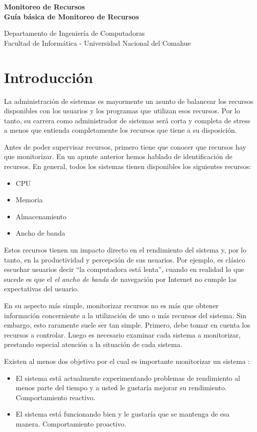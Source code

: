 \documentclass[12pt]{article}
\def\maketitle{

 \makeatletter
 {\color{bl} \centering \huge \sc \textbf{
 Monitoreo de Recursos \\ 
\large \vspace*{-8pt} \color{black} Guía básica de Monitoreo de Recursos 
 \vspace*{8pt} }\par}
 \makeatother


 \makeatletter
 {\centering \small 
 	Departamento de Ingeniería de Computadoras \\
 	Facultad de Informática - Universidad Nacional del Comahue \\
 	\vspace{20pt} }
 \makeatother

}
\begin{document}
\thispagestyle{empty}
\maketitle
\setlength{\parindent}{0pt}

\section*{Introducción}

La administración de sistemas es mayormente un asunto de balancear los 
recursos disponibles con los usuarios y los programas que utilizan esos 
recursos. Por lo tanto, su carrera como administrador de sistemas será 
corta y completa de stress a menos que entienda completamente los recursos 
que tiene a su disposición.

Antes de poder supervisar recursos, primero tiene que conocer que recursos 
hay que monitorizar. En un apunte anterior hemos hablado de identificación 
de recursos. En general, todos los sistemas tienen disponibles los 
siguientes recursos:

\begin{itemize}
\item CPU
\item Memoria
\item Almacenamiento
\item Ancho de banda
\end{itemize}

Estos recursos tienen un impacto directo en el rendimiento del sistema y, 
por lo tanto, en la productividad y percepción de sus usuarios. Por ejemplo,
es clásico escuchar usuarios decir ``la computadora está lenta'', cuando 
en realidad lo que sucede es que el \textit{el ancho de banda} de
navegación por Internet no cumple las expectativas del usuario. 

En su aspecto más simple, monitorizar recursos no es más que obtener 
información concerniente a la utilización de uno o más recursos del sistema.
Sin embargo, esto raramente suele ser tan simple. Primero, debe tomar en 
cuenta los recursos a controlar. Luego es necesario examinar cada sistema 
a monitorizar, prestando especial atención a la situación de cada sistema.

Existen al menos dos objetivo por el cual es importante monitorizar un
sistema :

\begin{itemize}
\item El sistema está actualmente experimentando problemas de rendimiento
al menos parte del tiempo y a usted le gustaría mejorar su rendimiento. 
Comportamiento reactivo. 

\item El sistema está funcionando bien y le gustaría que se mantenga de esa 
manera. Comportamiento proactivo. 
\end{itemize}
\end{document}
